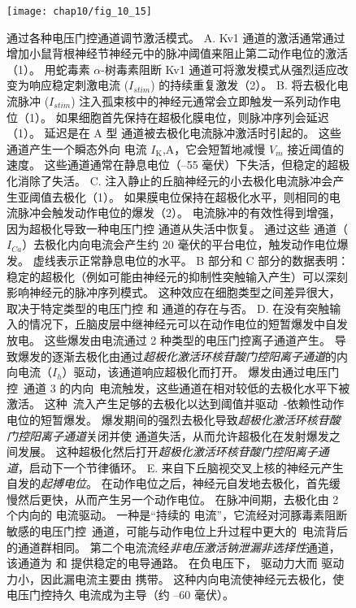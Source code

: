 \begin{figure}[htbp]
	\centering
	\texttt{[image: chap10/fig\_10\_15]}
	\caption{通过各种电压门控通道调节激活模式。
		A. Kv1 通道的激活通常通过增加小鼠背根神经节神经元中的脉冲阈值来阻止第二动作电位的激活（1）。
		用蛇毒素 $\alpha$-树毒素阻断 Kv1 通道可将激发模式从强烈适应改变为响应稳定刺激电流 ($I_{stim}$) 的持续重复激发（2）。
		B. 将去极化电流脉冲 ($I_{stim}$) 注入孤束核中的神经元通常会立即触发一系列动作电位（1）。
		如果细胞首先保持在超极化膜电位，则脉冲序列会延迟（1）。
		延迟是在 A 型  通道被去极化电流脉冲激活时引起的。
		这些通道产生一个瞬态外向  电流 $I_\text{K}$,A，它会短暂地减慢 $V_m$ 接近阈值的速度。
		这些通道通常在静息电位（–55 毫伏）下失活，但稳定的超极化消除了失活\cite{dekin1987vitro}。
		C. 注入静止的丘脑神经元的小去极化电流脉冲会产生亚阈值去极化（1）。
		如果膜电位保持在超极化水平，则相同的电流脉冲会触发动作电位的爆发（2）。
		电流脉冲的有效性得到增强，因为超极化导致一种电压门控  通道从失活中恢复。
		通过这些  通道（$I_{Ca}$）去极化内向电流会产生约 20 毫伏的平台电位，触发动作电位爆发。
		虚线表示正常静息电位的水平\cite{llinas1982electrophysiology}。
		B 部分和 C 部分的数据表明：稳定的超极化（例如可能由神经元的抑制性突触输入产生）可以深刻影响神经元的脉冲序列模式。
		这种效应在细胞类型之间差异很大，取决于特定类型的电压门控  和  通道的存在与否。
		D. 在没有突触输入的情况下，丘脑皮层中继神经元可以在动作电位的短暂爆发中自发放电。
		这些爆发由电流通过 2 种类型的电压门控离子通道产生。
		导致爆发的逐渐去极化由通过\textit{超极化激活环核苷酸门控阳离子通道}的内向电流（$I_h$）驱动，该通道响应超极化而打开。
		爆发由通过电压门控~通道 3 的内向~电流触发，这些通道在相对较低的去极化水平下被激活。
		这种~流入产生足够的去极化以达到阈值并驱动~-依赖性动作电位的短暂爆发。
		爆发期间的强烈去极化导致\textit{超极化激活环核苷酸门控阳离子通道}关闭并使  通道失活，从而允许超极化在发射爆发之间发展。
		这种超极化然后打开\textit{超极化激活环核苷酸门控阳离子通道}，启动下一个节律循环\cite{mccormick1992model}。
		E. 来自下丘脑视交叉上核的神经元产生自发的\textit{起搏电位}。
		在动作电位之后，神经元自发地去极化，首先缓慢然后更快，从而产生另一个动作电位。
		在脉冲间期，去极化由 2 个内向的  电流驱动。
		一种是“持续的  电流”，它流经对河豚毒素阻断敏感的电压门控~通道，可能与动作电位上升过程中更大的~电流背后的通道群相同。
		第二个电流流经\textit{非电压激活钠泄漏非选择性}通道，该通道为  和  提供稳定的电导通路。
		在负电压下， 驱动力大而  驱动力小，因此漏电流主要由  携带。
		这种内向电流使神经元去极化，使电压门控持久  电流成为主导（约 –60 毫伏）\cite{jackson2004mechanism}。}
	\label{fig:10_15}
\end{figure}


